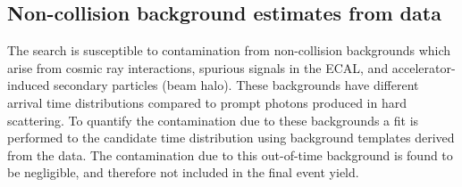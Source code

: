 





\subsection{Non-collision background estimates from data}

The search is susceptible to contamination from non-collision backgrounds which arise from cosmic ray interactions, spurious signals in the ECAL, and accelerator-induced secondary particles (beam halo). These backgrounds have different arrival time distributions compared to prompt photons produced in hard scattering. To quantify the contamination due to these backgrounds a fit is performed to the candidate time distribution using background templates derived from the data. The contamination due to this out-of-time background  is found to be negligible, and therefore not included in the final event yield.

